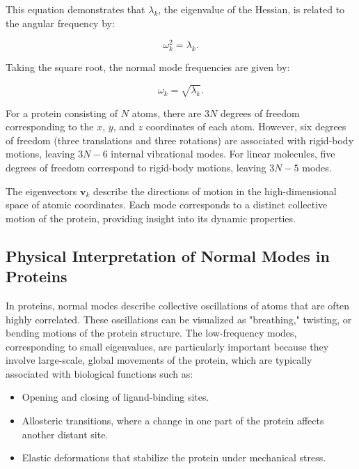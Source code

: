\documentclass[English, Lau, oneside]{sapthesis}
\begin{document}
This equation demonstrates that \( \lambda_k \), the eigenvalue of the Hessian, is related to the angular frequency by:

\begin{equation}
\omega_k^2 = \lambda_k.
\end{equation}

Taking the square root, the normal mode frequencies are given by:

\begin{equation}
\omega_k = \sqrt{\lambda_k}.
\end{equation}

For a protein consisting of \( N \) atoms, there are \( 3N \) degrees of freedom corresponding to the \( x \), \( y \), and \( z \) coordinates of each atom. However, six degrees of freedom (three translations and three rotations) are associated with rigid-body motions, leaving \( 3N - 6 \) internal vibrational modes. For linear molecules, five degrees of freedom correspond to rigid-body motions, leaving \( 3N - 5 \) modes.

The eigenvectors \( \mathbf{v}_k \) describe the directions of motion in the high-dimensional space of atomic coordinates. Each mode corresponds to a distinct collective motion of the protein, providing insight into its dynamic properties.

\subsection{Physical Interpretation of Normal Modes in Proteins}

In proteins, normal modes describe collective oscillations of atoms that are often highly correlated. These oscillations can be visualized as "breathing," twisting, or bending motions of the protein structure. The low-frequency modes, corresponding to small eigenvalues, are particularly important because they involve large-scale, global movements of the protein, which are typically associated with biological functions such as:

\begin{itemize}
    \item Opening and closing of ligand-binding sites.
    \item Allosteric transitions, where a change in one part of the protein affects another distant site.
    \item Elastic deformations that stabilize the protein under mechanical stress.
\end{itemize}
\end{document}
